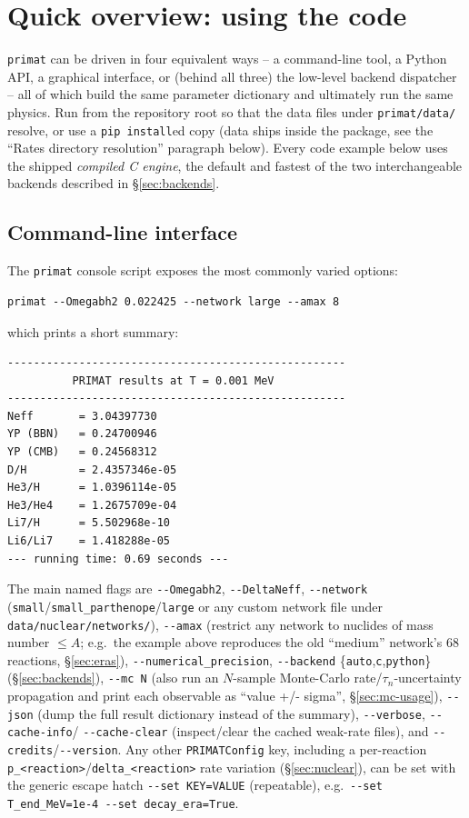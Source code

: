 \documentclass[11pt,a4paper]{article}
\newcommand{\code}[1]{\texttt{#1}}
\begin{document}
\section{Quick overview: using the code}\label{sec:usage}

\code{primat} can be driven in four equivalent ways -- a command-line tool, a
Python API, a graphical interface, or (behind all three) the low-level
backend dispatcher -- all of which build the same parameter dictionary and
ultimately run the same physics. Run from the repository root so that the
data files under \code{primat/data/} resolve, or use a \code{pip install}ed
copy (data ships inside the package, see the ``Rates directory resolution''
paragraph below). Every code example below uses the shipped \emph{compiled C
engine}, the default and fastest of the two interchangeable backends
described in \S\ref{sec:backends}.

\subsection{Command-line interface}
The \code{primat} console script exposes the most commonly varied options:
\begin{lstlisting}[style=sh]
primat --Omegabh2 0.022425 --network large --amax 8
\end{lstlisting}
which prints a short summary:
\begin{lstlisting}[style=sh]
----------------------------------------------------
          PRIMAT results at T = 0.001 MeV
----------------------------------------------------
Neff       = 3.04397730
YP (BBN)   = 0.24700946
YP (CMB)   = 0.24568312
D/H        = 2.4357346e-05
He3/H      = 1.0396114e-05
He3/He4    = 1.2675709e-04
Li7/H      = 5.502968e-10
Li6/Li7    = 1.418288e-05
--- running time: 0.69 seconds ---
\end{lstlisting}
The main named flags are \code{-{}-Omegabh2}, \code{-{}-DeltaNeff},
\code{-{}-network} (\code{small}/\code{small\_parthenope}/\code{large} or any
custom network file under \code{data/nuclear/networks/}), \code{-{}-amax}
(restrict any network to nuclides of mass number $\le A$; e.g.\ the example
above reproduces the old ``medium'' network's 68 reactions, \S\ref{sec:eras}),
\code{-{}-numerical\_precision}, \code{-{}-backend}
\{\code{auto},\code{c},\code{python}\} (\S\ref{sec:backends}),
\code{-{}-mc N} (also run an $N$-sample Monte-Carlo rate/$\tau_n$-uncertainty
propagation and print each observable as ``value +/- sigma'',
\S\ref{sec:mc-usage}), \code{-{}-json} (dump the full result dictionary
instead of the summary), \code{-{}-verbose}, \code{-{}-cache-info}/
\code{-{}-cache-clear} (inspect/clear the cached weak-rate files), and
\code{-{}-credits}/\code{-{}-version}. Any other \code{PRIMATConfig} key,
including a per-reaction \code{p\_<reaction>}/\code{delta\_<reaction>} rate
variation (\S\ref{sec:nuclear}), can be set with the generic escape hatch
\code{-{}-set KEY=VALUE} (repeatable), e.g.\
\code{-{}-set T\_end\_MeV=1e-4 -{}-set decay\_era=True}.
\end{document}
